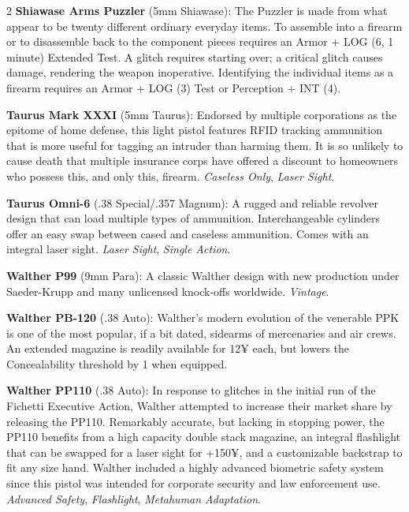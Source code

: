 \documentclass[
  oneside]{article}
\begin{document}
\begin{multicols}{2}
\textbf{Shiawase Arms Puzzler} (5mm Shiawase): The
Puzzler is made from what appear to be twenty
different ordinary everyday items. To assemble
into a firearm or to disassemble back to the
component pieces requires an Armor + LOG (6, 1
minute) Extended Test. A glitch requires starting
over; a critical glitch causes damage, rendering
the weapon inoperative. Identifying the individual
items as a firearm requires an Armor + LOG (3)
Test or Perception + INT (4).

\textbf{Taurus Mark XXXI} (5mm Taurus): Endorsed
by multiple corporations as the epitome of home
defense, this light pistol features RFID tracking
ammunition that is more useful for tagging an
intruder than harming them. It is so unlikely to
cause death that multiple insurance corps have
offered a discount to homeowners who possess this,
and only this, firearm. \emph{Caseless Only},
\emph{Laser Sight}.

\textbf{Taurus Omni-6} (.38 Special/.357 Magnum):
A rugged and reliable revolver design that can
load multiple types of ammunition. Interchangeable
cylinders offer an easy swap between cased and
caseless ammunition. Comes with an integral laser
sight. \emph{Laser Sight}, \emph{Single Action}.

\textbf{Walther P99} (9mm Para): A classic Walther
design with new production under Saeder-Krupp and
many unlicensed knock-offs worldwide.
\emph{Vintage}.

\textbf{Walther PB-120} (.38 Auto): Walther's
modern evolution of the venerable PPK is one of
the most popular, if a bit dated, sidearms of
mercenaries and air crews. An extended magazine is
readily available for 12¥ each, but lowers the
Concealability threshold by 1 when equipped.

\textbf{Walther PP110} (.38 Auto): In response to
glitches in the initial run of the Fichetti
Executive Action, Walther attempted to increase
their market share by releasing the PP110.
Remarkably accurate, but lacking in stopping
power, the PP110 benefits from a high capacity
double stack magazine, an integral flashlight that
can be swapped for a laser sight for +150¥, and a
customizable backstrap to fit any size hand.
Walther included a highly advanced biometric
safety system since this pistol was intended for
corporate security and law enforcement use.
\emph{Advanced Safety}, \emph{Flashlight},
\emph{Metahuman Adaptation}.


\end{multicols}
\end{document}
